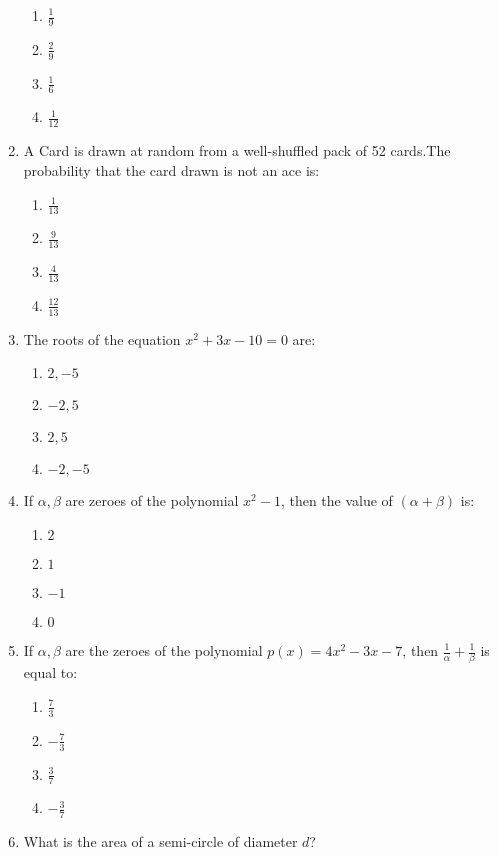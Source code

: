\documentclass{article}
\begin{document}
\begin{enumerate}
	\begin{enumerate}
	\item  $\frac{1}{9}$
	\item $\frac{2}{9}$
	\item  $\frac{1}{6}$
	\item  $\frac{1}{12}$
\end{enumerate}
\item A Card is drawn at random from a well-shuffled pack of 52 cards.The probability that the card drawn is not an ace is:
\begin{enumerate}
	\item $\frac{1}{13}$
	\item  $\frac{9}{13}$
	\item $\frac{4}{13}$
	\item $\frac{12}{13}$
\end{enumerate}
\item The roots of the equation $x^2 + 3x - 10 = 0$ are:

\begin{enumerate}
    \item$2, -5$
    \item $-2, 5$
    \item $2, 5$
    \item $-2, -5$
\end{enumerate}

\item If $\alpha, \beta$ are zeroes of the polynomial $x^2 - 1$, then the value of $(\alpha + \beta)$ is:

\begin{enumerate}
    \item $2$
    \item $1$
    \item $-1$
    \item $0$
\end{enumerate}
\newpage
\item If $ \alpha, \beta $ are the zeroes of the polynomial $ p(x) = 4x^2 - 3x - 7 $, then $ \frac{1}{\alpha} + \frac{1}{\beta} $ is equal to:

\begin{enumerate}
    \item $\frac{7}{3}$
    \item$-\frac{7}{3}$
    \item $\frac{3}{7}$
    \item $-\frac{3}{7}$
\end{enumerate}
\item What is the area of a semi-circle of diameter \(d\)?


\end{enumerate}
\end{document}
